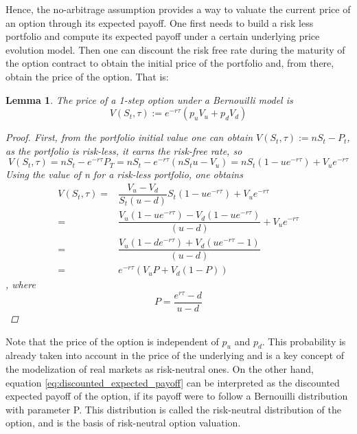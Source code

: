 \documentclass[12,twoside]{mammeTFM}
\newtheorem{lem}[thm]{Lemma}
\theoremstyle{definition}
\theoremstyle{remark}
\begin{document}
Hence, the no-arbitrage assumption provides a way to valuate the current price of an option through its expected payoff. One first needs to build a risk less portfolio and compute its expected payoff under a certain underlying price evolution model. Then one can discount the risk free rate during the maturity of the option contract to obtain the initial price of the portfolio and, from there, obtain the price of the option. That is:
\begin{lem} The price of a 1-step option under a Bernouilli model is
\begin{equation}
V(S_t, \tau) := e^{-r\tau} \left( p_u V_u + p_d V_d \right)
\end{equation}
\begin{proof}
First, from the portfolio initial value one can obtain $V(S_t, \tau) := n S_t - P_t$, as the portfolio is risk-less,  it earns the risk-free rate, so 
\begin{equation}
V(S_t, \tau) = n S_t - e^{-r\tau} P_T = n S_t - e^{-r\tau}\left(n S_t u - V_u \right) = nS_t(1 - u e^{-r\tau}) + V_u e^{-r\tau}
\end{equation}
Using the value of n for a risk-less portfolio, one obtains
\begin{align}
V(S_t, \tau) =& \dfrac{V_u - V_d}{S_t(u - d)} S_t(1 - u e^{-r\tau}) + V_u e^{-r\tau} \\
 =& \dfrac{V_u (1 - u e^{-r\tau}) - V_d (1 - u e^{-r\tau})}{(u - d)} + V_u e^{-r\tau} \\
 =& \dfrac{V_u (1 - d e^{-r\tau}) + V_d (u e^{-r\tau} - 1)}{(u - d)} \\
 \label{eq:discounted_expected_payoff}
 =& e^{-r\tau} \left( V_u P + V_d (1 - P) \right)
\end{align}
, where
\begin{equation}
P = \dfrac{e^{r\tau} - d}{u - d}
\end{equation}
\end{proof}
\end{lem}

Note that the price of the option is independent of $p_u$ and $p_d$. This probability is already taken into account in the price of the underlying and is a key concept of the modelization of real markets as risk-neutral ones. On the other hand, equation \ref{eq:discounted_expected_payoff} can be interpreted as the discounted expected payoff of the option, if its payoff were to follow a Bernouilli distribution with parameter P. This distribution is called the risk-neutral distribution of the option, and is the basis of risk-neutral option valuation.
\end{document}
